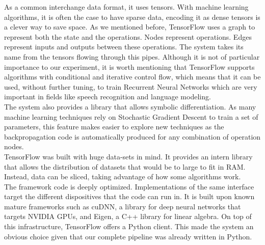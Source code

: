 As a common interchange data format, it uses tensors. With machine learning algorithms, it is often the case to have sparse data, encoding it as dense tensors is a clever way to save space. As we mentioned before, TensorFlow uses a graph to represent both the state and the operations. Nodes represent operations. Edges represent inputs and outputs between these operations. The system takes its name from the tensors flowing through this pipes. Although it is not of particular importance to our experiment, it is worth mentioning that TensorFlow supports algorithms with conditional and iterative control flow, which means that it can be used, without further tuning, to train Recurrent Neural Networks which are very important in fields like speech recognition and language modeling.\\

The system also provides a library that allows symbolic differentiation. As many machine learning techniques rely on Stochastic Gradient Descent to train a set of parameters, this feature makes easier to explore new techniques as the backpropagation code is automatically produced for any combination of operation nodes.\\

TensorFlow was built with huge data-sets in mind. It provides an intern library that allows the distribution of datasets that would be to large to fit in RAM. Instead, data can be sliced, taking advantage of how some algorithms work.\\

The framework code is deeply optimized. Implementations of the same interface target the different dispositives that the code can run in. It is built upon known mature frameworks such as cuDNN, a library for deep neural networks that targets NVIDIA GPUs, and Eigen, a C++ library for linear algebra. On top of this infrastructure, TensorFlow offers a Python client. This made the system an obvious choice given that our complete pipeline was already written in Python.\\














